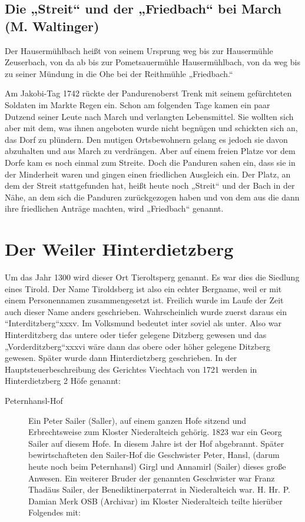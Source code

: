 \documentclass{book}
\begin{document}
\subsection{Die „Streit“ und der „Friedbach“ bei March (M. Waltinger)}

Der Hausermühlbach heißt von seinem Ursprung weg bis zur Hausermühle Zeuserbach,
von da ab bis zur Pometsauermühle Hausermühlbach, von da weg bis zu seiner
Mündung in die Ohe bei der Reithmühle „Friedbach.“

Am Jakobi-Tag 1742 rückte der Pandurenoberst Trenk mit seinem gefürchteten
Soldaten im Markte Regen ein. Schon am folgenden Tage kamen ein paar Dutzend
seiner Leute nach March und verlangten Lebensmittel. Sie wollten sich aber mit
dem, was ihnen angeboten wurde nicht begnügen und schickten sich an, das Dorf zu
plündern. Den mutigen Ortsbewohnern gelang es jedoch sie davon abzuhalten und
aus March zu verdrängen. Aber auf einem freien Platze vor dem Dorfe kam es noch
einmal zum Streite. Doch die Panduren sahen ein, dass sie in der Minderheit
waren und gingen einen friedlichen Ausgleich ein. Der Platz, an dem der Streit
stattgefunden hat, heißt heute noch „Streit“ und der Bach in der Nähe, an dem
sich die Panduren zurückgezogen haben und von dem aus die dann ihre friedlichen
Anträge machten, wird „Friedbach“ genannt.

\section{Der Weiler Hinterdietzberg}

Um das Jahr 1300 wird dieser Ort Tieroltsperg genannt. Es war dies die Siedlung
eines Tirold. Der Name Tiroldsberg ist also ein echter Bergname, weil er mit
einem Personennamen zusammengesetzt ist. Freilich wurde im Laufe der Zeit auch
dieser Name anders geschrieben. Wahrscheinlich wurde zuerst daraus ein
“Interditzberg“xxxv. Im Volksmund bedeutet inter soviel als unter. Also war
Hinterditzberg das untere oder tiefer gelegene Ditzberg gewesen und das
„Vorderditzberg“xxxvi wäre dann das obere oder höher gelegene Ditzberg gewesen.
Später wurde dann Hinterdietzberg geschrieben. In der Hauptsteuerbeschreibung
des Gerichtes Viechtach von 1721 werden in Hinterdietzberg 2 Höfe genannt:

\begin{description}
\item[Peternhansl-Hof] Ein Peter Sailer (Saller), auf einem ganzen Hofe sitzend
und Erbrechtsweise zum Kloster Niederalteich gehörig. 1823 war ein Georg Sailer
auf diesem Hofe. In diesem Jahre ist der Hof abgebrannt. Später bewirtschafteten
den Sailer-Hof die Geschwister Peter, Hansl, (darum heute noch beim Peternhansl)
Girgl und Annamirl (Sailer) dieses große Anwesen. Ein weiterer Bruder der
genannten Geschwister war Franz Thadäus Sailer, der Benediktinerpaterrat in
Niederalteich war. H. Hr. P. Damian Merk OSB (Archivar) im Kloster Niederalteich
teilte hierüber Folgendes mit:
\end{description}
\end{document}
